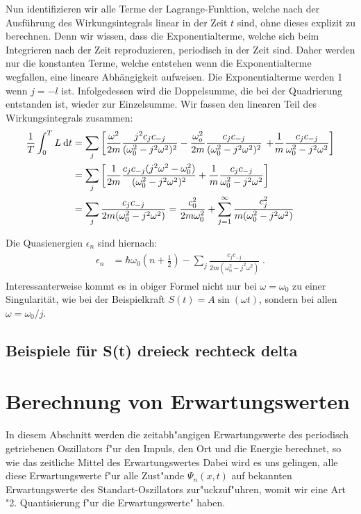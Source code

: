    Nun identifizieren wir alle Terme der Lagrange-Funktion, welche nach der Ausführung des Wirkungsintegrals linear in der Zeit $t$ sind, ohne dieses explizit zu berechnen.
   Denn wir wissen, dass die Exponentialterme, welche sich beim Integrieren nach der Zeit reproduzieren, periodisch in der Zeit sind.
   Daher werden nur die konstanten Terme, welche entstehen wenn die Exponentialterme wegfallen, eine lineare Abhängigkeit aufweisen.
   Die Exponentialterme werden 1 wenn $j=-l$ ist.
   Infolgedessen wird die Doppelsumme, die bei der Quadrierung entstanden ist, wieder zur Einzelsumme.
   Wir fassen den linearen Teil des Wirkungsintegrals zusammen:
   \begin{align}
     \begin{split}
       \frac{1}{T} \int_0^T L \: \text d t
       &= \sum_j \left[\frac{\omega^2}{2m} \frac{j^2c_jc_{-j}}{(\omega_0^2-j^2\omega^2)^2}
       - \frac{\omega_o^2}{2m} \frac{c_jc_{-j}}{(\omega_0^2-j^2\omega^2)^2} \right.
       \left. +\frac{1}{m} \frac{c_jc_{-j}}{\omega_0^2-j^2\omega^2}
       \right]\\
       &= \sum_j \left[\frac{1}{2m} \frac{c_jc_{-j}(j^2\omega^2-\omega_0^2)}{(\omega_0^2-j^2\omega^2)^2} + \frac{1}{m} \frac{c_jc_{-j}}{\omega_0^2-j^2\omega^2} \right] \\
       &= \sum_j \frac{c_jc_{-j}}{2m(\omega_0^2-j^2\omega^2)} = \frac{c_0^2}{2m\omega_0^2} + \sum_{j=1}^\infty \frac{c_j^2}{m(\omega_0^2-j^2\omega^2)}
     \end{split}
   \end{align}

   Die Quasienergien $\epsilon_n$ sind hiernach:
   \begin{align}
     \begin{split}
       \epsilon_n &= \hbar \omega_0\left(n+\frac{1}{2}\right) - \sum_j \frac{c_jc_{-j}}{2m(\omega_0^2-j^2\omega^2)} \; .
     \end{split}
   \end{align}
   Interessanterweise kommt es in obiger Formel nicht nur bei $\omega = \omega_0$ zu einer Singularität, wie bei der Beispielkraft $S(t) = A\sin(\omega t)$, sondern bei allen $\omega = \omega_0 / j$.



   \subsection{Beispiele für S(t) dreieck rechteck delta}

\section{Berechnung von Erwartungswerten}
  In diesem Abschnitt werden die zeitabh"angigen Erwartungswerte des periodisch getriebenen Oszillators f"ur den Impuls, den Ort und die Energie berechnet, so wie das zeitliche Mittel des Erwartungswertes
  Dabei wird es uns gelingen, alle diese Erwartungswerte f"ur alle Zust"ande $\Psi_n(x,t)$ auf bekannten Erwartungswerte des Standart-Oszillators zur"uckzuf"uhren, womit wir eine Art "2. Quantisierung f"ur die Erwartungswerte" haben.


